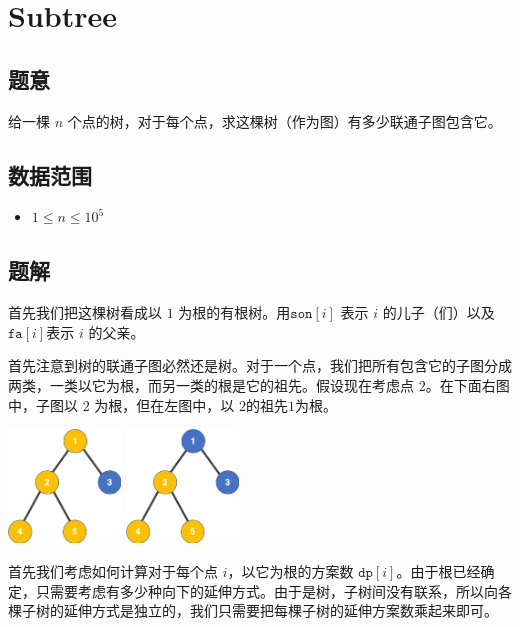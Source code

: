 \section{Subtree}
\subsection*{题意}
给一棵 $n$ 个点的树，对于每个点，求这棵树（作为图）有多少联通子图包含它。
\subsection*{数据范围}
\begin{itemize}
\item $1 \leq n \leq 10^5$
\end{itemize}

\subsection*{题解}

首先我们把这棵树看成以 $1$ 为根的有根树。用$\texttt{son}[i]$ 表示 $i$ 的儿子（们）以及$\texttt{fa}[i]$表示 $i$ 的父亲。

首先注意到树的联通子图必然还是树。对于一个点，我们把所有包含它的子图分成两类，一类以它为根，而另一类的根是它的祖先。假设现在考虑点 $2$。在下面右图中，子图以 $2$ 为根，但在左图中，以 $2$的祖先$1$为根。

\begin{center}
\includegraphics[width=3cm]{./Pics/with_root.png}
\includegraphics[width=3cm]{./Pics/without_root.png}
\end{center}


首先我们考虑如何计算对于每个点 $i$，以它为根的方案数 $\texttt{dp}[i]$。由于根已经确定，只需要考虑有多少种向下的延伸方式。由于是树，子树间没有联系，所以向各棵子树的延伸方式是独立的，我们只需要把每棵子树的延伸方案数乘起来即可。

